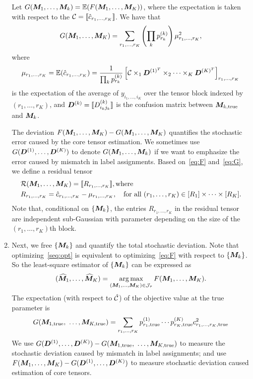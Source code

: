 \documentclass{article}
\begin{document}
\begin{appendices}
\begin{enumerate}
Let $G(\bm M_1,\ldots,\bm M_k)=\mathbb{E}(F(\bm M_1,\ldots,\bm M_K))$, where the expectation is taken with respect to the $\mathcal{C}=\llbracket  \hat c_{r_1,\ldots,r_K} \rrbracket$. We have that  
\begin{equation}\label{eq:G}
G(\bm M_1,\ldots,\bm M_K)=\sum_{r_1,\ldots,r_K} \left(\prod_k p^{(k)}_{r_k}\right) \mu^2_{r_1,\ldots,r_K},
\end{equation}
where
\[
\mu_{r_1,\ldots,r_K}=\mathbb{E}(\hat c_{r_1,\ldots,r_K})={1\over \prod_k p^{(k)}_{r_k}}\left[ \mathcal{C}\times_1 \bm{D}^{(1)^T} \times_2\cdots\times_K \bm{D}^{(K)^T}\right]_{r_1,\ldots,r_K}
\]
is the expectation of the average of $y_{i_1,\ldots,i_K}$ over the tensor block indexed by $(r_1,\ldots,r_K)$, and $\bm{D}^{(k)}=\llbracket D^{(k)}_{i_kj_k} \rrbracket$ is the confusion matrix between $\bm M_{k,\text{true}}$ and $\bm M_k$.

The deviation $F(\bm M_1,\ldots,\bm M_K)-G(\bm M_1,\ldots,\bm M_K)$ quantifies the stochastic error caused by the core tensor estimation. We sometimes use $G(\bm{D}^{(1)},\ldots,\bm{D}^{(K)})$ to denote $G(\bm M_1,\ldots,\bm M_k)$ if we want to emphasize the error caused by mismatch in label assignments. 
Based on~\eqref{eq:F} and~\eqref{eq:G}, we define a residual tensor 
\begin{align}\label{eq:residual}
&\mathcal{R}(\bm M_1,\ldots,\bm M_K)=\llbracket R_{r_1,\ldots,r_K} \rrbracket,\text{where}\\
&R_{r_1,\ldots,r_K}= \hat c_{r_1,\ldots,r_K}-\mu_{r_1,\ldots,r_K} ,\quad \text{for all }(r_1,\ldots,r_K)\in[R_1]\times\cdots\times[R_K].
\end{align}
Note that, conditional on $\{\bm M_k\}$, the entries $R_{r_1,\ldots,r_K}$ in the residual tensor are independent sub-Gaussian with parameter depending on the size of the $(r_1,\ldots,r_K)$th block. 


\item Next, we free $\{\bm M_k\}$ and quantify the total stochastic deviation. Note that optimizing~\eqref{seq:opt} is equivalent to optimizing~\eqref{eq:F} with respect to $\{\bm M_k\}$. So the least-square estimator of $\{\bm M_k\}$ can be expressed as
\begin{equation}
   (\widehat{\bm M}_1,\ldots,\widehat{\bm M}_K) = \displaystyle\operatorname*{arg\,max}_{(\bm M_1,\ldots,\bm M_K)\in \mathcal{J}_\tau}F(\bm M_1,\ldots,\bm M_K).
\end{equation}
The expectation (with respect to $\hat {\mathcal{C}}$) of the objective value at the true parameter is
\[
G(\mM_{1,\text{true}},\ \ldots,\mM_{K,\text{true}})=\sum_{r_1,\ldots,r_K} p^{(1)}_{r_1,\text{true}} \cdots p^{(K)}_{r_K,\text{true}}c^2_{r_1,\ldots,r_K,\text{true}}
\]
We use $ G(\mD^{(1)},\ldots,\mD^{(K)})-G(\mM_{1,\text{true}},\ \ldots,\mM_{K,\text{true}})$ to measure the stochastic deviation caused by mismatch in label assignments; and use $F(\bm M_1,\ldots,\bm M_K)-G(\bm{D}^{(1)},\ldots,\bm{D}^{(K)})$ to measure stochastic deviation caused estimation of core tensors.  



\end{enumerate}
\end{appendices}
\end{document}
